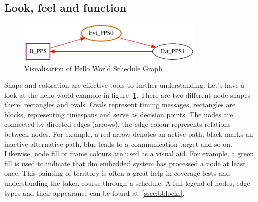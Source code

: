 \subsection{Look, feel and function}
\begin{figure}[H]
   \centering
   \def\svgwidth{0.5\textwidth}
   \includegraphics*[width=0.8\textwidth,keepaspectratio]{Figures/helloworld}
   \caption{Visualisation of Hello World Schedule Graph}
   \label{fig:hello}
\end{figure}
Shape and coloration are effective tools to further understanding.
Let's have a look at the hello world example in figure~\ref{fig:hello}. There are two different node shapes there, rectangles and ovals. Ovals represent timing messages, rectangles are blocks, representing timespans and serve as decision points. The nodes are connected by directed edges (arrows), the edge colour represents relations between nodes. For example, a red arrow denotes an active path, black marks an inactive alternative path, blue leads to a communication target and so on. Likewise, node fill or frame colours are used as a visual aid. For example, a green fill is used to indicate that \gls{dm} embedded system has processed a node at least once. This painting of territory is often a great help in coverage tests and understanding the taken course through a schedule. A full legend of nodes, edge types and their appearance can be found at~\ref{ssec:bblocks}.
